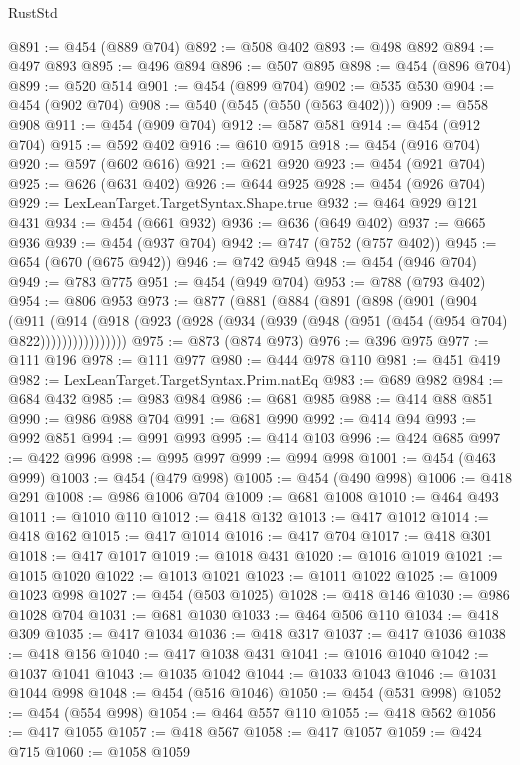 \begin{lexlean}{RustStd}
\begin{coremodule}
@891 := @454 (@889 @704)
@892 := @508 @402
@893 := @498 @892
@894 := @497 @893
@895 := @496 @894
@896 := @507 @895
@898 := @454 (@896 @704)
@899 := @520 @514
@901 := @454 (@899 @704)
@902 := @535 @530
@904 := @454 (@902 @704)
@908 := @540 (@545 (@550 (@563 @402)))
@909 := @558 @908
@911 := @454 (@909 @704)
@912 := @587 @581
@914 := @454 (@912 @704)
@915 := @592 @402
@916 := @610 @915
@918 := @454 (@916 @704)
@920 := @597 (@602 @616)
@921 := @621 @920
@923 := @454 (@921 @704)
@925 := @626 (@631 @402)
@926 := @644 @925
@928 := @454 (@926 @704)
@929 := LexLeanTarget.TargetSyntax.Shape.true
@932 := @464 @929 @121 @431
@934 := @454 (@661 @932)
@936 := @636 (@649 @402)
@937 := @665 @936
@939 := @454 (@937 @704)
@942 := @747 (@752 (@757 @402))
@945 := @654 (@670 (@675 @942))
@946 := @742 @945
@948 := @454 (@946 @704)
@949 := @783 @775
@951 := @454 (@949 @704)
@953 := @788 (@793 @402)
@954 := @806 @953
@973 := @877
    (@881
      (@884
        (@891
          (@898
            (@901
              (@904
                (@911
                  (@914
                    (@918 (@923 (@928 (@934 (@939 (@948 (@951 (@454 (@954 @704) @822))))))))))))))))
@975 := @873 (@874 @973)
@976 := @396 @975
@977 := @111 @196
@978 := @111 @977
@980 := @444 @978 @110
@981 := @451 @419
@982 := LexLeanTarget.TargetSyntax.Prim.natEq
@983 := @689 @982
@984 := @684 @432
@985 := @983 @984
@986 := @681 @985
@988 := @414 @88 @851
@990 := @986 @988 @704
@991 := @681 @990
@992 := @414 @94
@993 := @992 @851
@994 := @991 @993
@995 := @414 @103
@996 := @424 @685
@997 := @422 @996
@998 := @995 @997
@999 := @994 @998
@1001 := @454 (@463 @999)
@1003 := @454 (@479 @998)
@1005 := @454 (@490 @998)
@1006 := @418 @291
@1008 := @986 @1006 @704
@1009 := @681 @1008
@1010 := @464 @493
@1011 := @1010 @110
@1012 := @418 @132
@1013 := @417 @1012
@1014 := @418 @162
@1015 := @417 @1014
@1016 := @417 @704
@1017 := @418 @301
@1018 := @417 @1017
@1019 := @1018 @431
@1020 := @1016 @1019
@1021 := @1015 @1020
@1022 := @1013 @1021
@1023 := @1011 @1022
@1025 := @1009 @1023 @998
@1027 := @454 (@503 @1025)
@1028 := @418 @146
@1030 := @986 @1028 @704
@1031 := @681 @1030
@1033 := @464 @506 @110
@1034 := @418 @309
@1035 := @417 @1034
@1036 := @418 @317
@1037 := @417 @1036
@1038 := @418 @156
@1040 := @417 @1038 @431
@1041 := @1016 @1040
@1042 := @1037 @1041
@1043 := @1035 @1042
@1044 := @1033 @1043
@1046 := @1031 @1044 @998
@1048 := @454 (@516 @1046)
@1050 := @454 (@531 @998)
@1052 := @454 (@554 @998)
@1054 := @464 @557 @110
@1055 := @418 @562
@1056 := @417 @1055
@1057 := @418 @567
@1058 := @417 @1057
@1059 := @424 @715
@1060 := @1058 @1059

\end{coremodule}
\end{lexlean}

